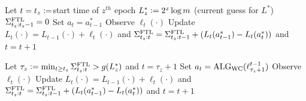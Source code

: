 \begin{algorithm}[!ht]
\SetAlgoNoLine
\caption{$\bob$ for Small-Loss}
\label{metaalg:UnknownSmallLoss}
{
    Let $t = t_z\mathrel{\mathop{:}}=$start time of $z^{th}$ epoch\;
    $L^*_z \mathrel{\mathop{:}}= 2^z \log m$ (current guess for $L^*$)\;
    $\Sigma^{\text{FTL}}_{t_z:t_z-1}=0$ \;
    {
        Set $a_t = a_{t-1}^{*}$%
        Observe $\ell_t(\cdot)$\; 
        Update $L_t(\cdot)=L_{t-1}(\cdot)+\ell_t(\cdot)$ and $\Sigma^{\text{FTL}}_{t_z:t}=\Sigma^{\text{FTL}}_{t_z:t-1}+(L_t(a_{t-1}^{*})-L_t(a_{t}^{*}))$ and $t = t+1$\;
    }

    Let $\tau_z := \min_{t \geq t_z} \Sigma^{\text{FTL}}_{t_z:t} > g(L^*_z)$ and $t = \tau_z + 1$\;
    {
        Set $a_t = \text{ALG}_{\text{WC}}(\ell_{\tau_z+1}^{t-1})$ 
        Observe $\ell_t(\cdot)$\; 
        Update $L_t(\cdot)=L_{t-1}(\cdot)+\ell_t(\cdot)$ and $\Sigma^{\text{FTL}}_{t_z:t}=\Sigma^{\text{FTL}}_{t_z:t-1}+(L_t(a_{t-1}^{*})-L_t(a_{t}^{*}))$ and $t = t+1$\;
    }    
    

    
}
\end{algorithm}


